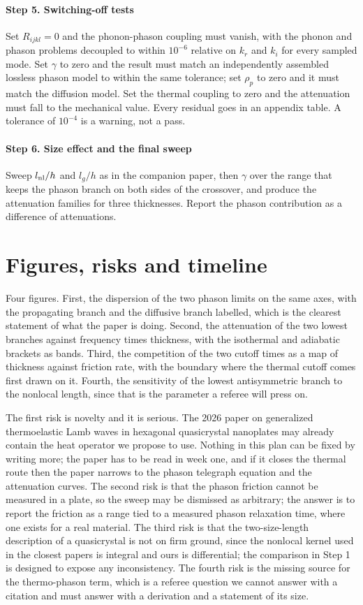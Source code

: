 \documentclass[11pt]{article}
\begin{document}
\paragraph{Step 5. Switching-off tests} Set $R_{ijkl}=0$ and the phonon-phason coupling must vanish, with the
phonon and phason problems decoupled to within $10^{-6}$ relative on $k_r$ and $k_i$ for every sampled
mode. Set $\gamma$ to zero and the result must match an independently assembled lossless phason model to
within the same tolerance; set $\rho_p$ to zero and it must match the diffusion model. Set the thermal
coupling to zero and the attenuation must fall to the mechanical value. Every residual goes in an appendix
table. A tolerance of $10^{-4}$ is a warning, not a pass.

\paragraph{Step 6. Size effect and the final sweep} Sweep $l_{\rm nl}/h$ and $l_g/h$ as in the companion paper,
then $\gamma$ over the range that keeps the phason branch on both sides of the crossover, and produce the
attenuation families for three thicknesses. Report the phason contribution as a difference of attenuations.

\section{Figures, risks and timeline}

Four figures. First, the dispersion of the two phason limits on the same axes, with the propagating branch
and the diffusive branch labelled, which is the clearest statement of what the paper is doing. Second, the
attenuation of the two lowest branches against frequency times thickness, with the isothermal and adiabatic
brackets as bands. Third, the competition of the two cutoff times as a map of thickness against friction
rate, with the boundary where the thermal cutoff comes first drawn on it. Fourth, the sensitivity of the
lowest antisymmetric branch to the nonlocal length, since that is the parameter a referee will press on.

The first risk is novelty and it is serious. The 2026 paper on generalized thermoelastic Lamb waves in
hexagonal quasicrystal nanoplates \cite{Zhang2026} may already contain the heat operator we propose to use.
Nothing in this plan can be fixed by writing more; the paper has to be read in week one, and if it closes the
thermal route then the paper narrows to the phason telegraph equation and the attenuation curves. The second
risk is that the phason friction cannot be measured in a plate, so the sweep may be dismissed as arbitrary;
the answer is to report the friction as a range tied to a measured phason relaxation time, where one exists
for a real material. The third risk is that the two-size-length description of a quasicrystal is not on firm
ground, since the nonlocal kernel used in the closest papers is integral and ours is differential; the
comparison in Step 1 is designed to expose any inconsistency. The fourth risk is the missing source for the
thermo-phason term, which is a referee question we cannot answer with a citation and must answer with a
derivation and a statement of its size.
\end{document}
